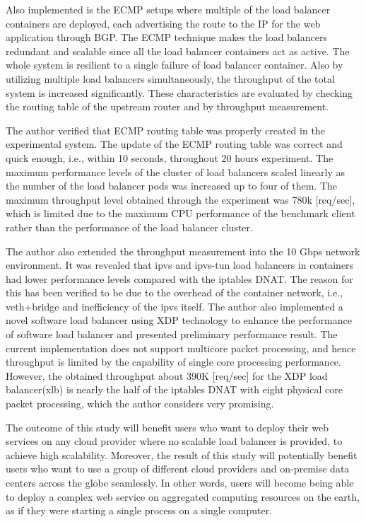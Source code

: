 Also implemented is the ECMP setups where multiple of the load balancer containers are deployed, each advertising the route to the IP for the web application through BGP.
The ECMP technique makes the load balancers redundant and scalable since all the load balancer containers act as active.
The whole system is resilient to a single failure of load balancer container.
Also by utilizing multiple load balancers simultaneously, the throughput of the total system is increased significantly.
These characteristics are evaluated by checking the routing table of the upstream router and by throughput measurement.

%
The author verified that ECMP routing table was properly created in the experimental system.
The update of the ECMP routing table was correct and quick enough, i.e., within 10 seconds, throughout 20 hours experiment.
The maximum performance levels of the cluster of load balancers scaled linearly as the number of the load balancer pods was increased up to four of them.
The maximum throughput level obtained through the experiment was 780k [req/sec], which is limited due to the maximum CPU performance of the benchmark client rather than the performance of the load balancer cluster.

The author also extended the throughput measurement into the 10 Gbps network environment.
It was revealed that ipvs and ipvs-tun load balancers in containers had lower performance levels compared with the iptables DNAT.
The reason for this has been verified to be due to the overhead of the container network, i.e., veth+bridge and inefficiency of the ipvs itself.
The author also implemented a novel software load balancer using XDP technology to enhance the performance of software load balancer and presented preliminary performance result.
The current implementation does not support multicore packet processing, and hence throughput is limited by the capability of single core processing performance.
However, the obtained throughput about 390K [req/sec] for the XDP load balancer(xlb) is nearly the half of the iptables DNAT with eight physical core packet processing, which the author considers very promising.
 
The outcome of this study will benefit users who want to deploy their web services on any cloud provider where no scalable load balancer is provided, to achieve high scalability.
Moreover, the result of this study will potentially benefit users who want to use a group of different cloud providers and on-premise data centers across the globe seamlessly.
In other words, users will become being able to deploy a complex web service on aggregated computing resources on the earth, as if they were starting a single process on a single computer.


